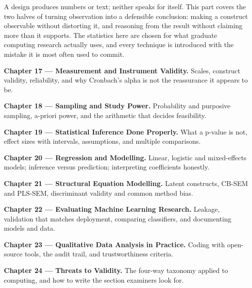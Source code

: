 
A design produces numbers or text; neither speaks for itself. This part
covers the two halves of turning observation into a defensible conclusion:
making a construct observable without distorting it, and reasoning from the
result without claiming more than it supports. The statistics here are chosen
for what graduate computing research actually uses, and every technique is
introduced with the mistake it is most often used to commit.

\begin{conceptbox}
\begin{tight}
  \item \textbf{Chapter 17 --- Measurement and Instrument Validity.} Scales, construct validity, reliability, and why Cronbach's alpha is not the reassurance it appears to be.
  \item \textbf{Chapter 18 --- Sampling and Study Power.} Probability and purposive sampling, a-priori power, and the arithmetic that decides feasibility.
  \item \textbf{Chapter 19 --- Statistical Inference Done Properly.} What a p-value is not, effect sizes with intervals, assumptions, and multiple comparisons.
  \item \textbf{Chapter 20 --- Regression and Modelling.} Linear, logistic and mixed-effects models; inference versus prediction; interpreting coefficients honestly.
  \item \textbf{Chapter 21 --- Structural Equation Modelling.} Latent constructs, CB-SEM and PLS-SEM, discriminant validity and common method bias.
  \item \textbf{Chapter 22 --- Evaluating Machine Learning Research.} Leakage, validation that matches deployment, comparing classifiers, and documenting models and data.
  \item \textbf{Chapter 23 --- Qualitative Data Analysis in Practice.} Coding with open-source tools, the audit trail, and trustworthiness criteria.
  \item \textbf{Chapter 24 --- Threats to Validity.} The four-way taxonomy applied to computing, and how to write the section examiners look for.
\end{tight}
\end{conceptbox}
